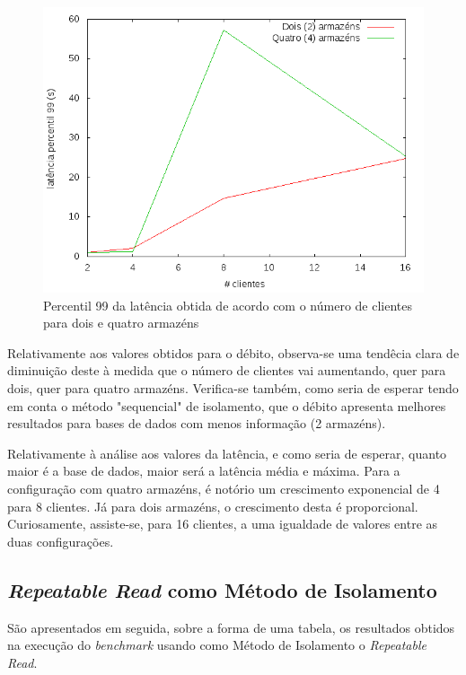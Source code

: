 
\begin{figure}[!h]
\centering
\includegraphics[scale=.4]{img/questao-1/ser-lat-pct99}
\caption{Percentil 99 da latência obtida de acordo com o número de clientes para dois e quatro armazéns}
\end{figure}

Relativamente aos valores obtidos para o débito, observa-se uma tendêcia clara de diminuição deste à medida que o número de clientes vai aumentando, quer para dois, quer para quatro armazéns.
Verifica-se também, como seria de esperar tendo em conta o método "sequencial" de isolamento, que o débito apresenta melhores resultados para bases de dados com menos informação (2 armazéns).

Relativamente à análise aos valores da latência, e como seria de esperar, quanto maior é a base de dados, maior será a latência média e máxima.
Para a configuração com quatro armazéns, é notório um crescimento exponencial de 4 para 8 clientes.
Já para dois armazéns, o crescimento desta é proporcional.
Curiosamente, assiste-se, para 16 clientes, a uma igualdade de valores entre as duas configurações.

\newpage

\subsection{\textit{Repeatable Read} como Método de Isolamento}

São apresentados em seguida, sobre a forma de uma tabela, os resultados obtidos na execução do \textit{benchmark} usando como Método de Isolamento o \textit{Repeatable Read}.

